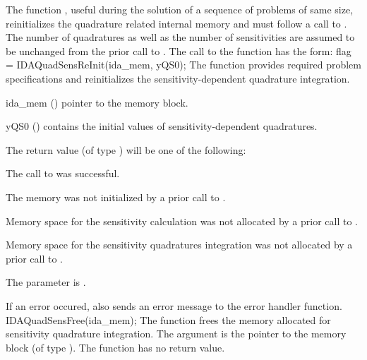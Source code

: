 The function , useful during the solution of a sequence 
of problems of same size, reinitializes the quadrature related internal memory 
and must follow a call to . The number  of 
quadratures as well as the number  of sensitivities are assumed to be 
unchanged from the prior call to .
The call to the  function has the form:
{
  flag = IDAQuadSensReInit(ida\_mem, yQS0);
}
{
  The function  provides required problem specifications 
  and reinitializes the sensitivity-dependent quadrature integration.
}
{
  \begin{args}
  \item[ida\_mem] ()
    pointer to the {\idas} memory block.
  \item[yQS0] ()
    contains the initial values of sensitivity-dependent quadratures.
  \end{args}
}
{
  The return value  (of type ) will be one of the following:
  \begin{args}
  \item[\Id{IDA\_SUCCESS}]
    The call to  was successful.
  \item[\Id{IDA\_MEM\_NULL}] 
    The {\idas} memory was not initialized by a prior call to .
  \item[\Id{IDA\_NO\_SENS}] 
    Memory space for the sensitivity calculation was not allocated by a prior
    call to .
  \item[\Id{IDA\_NO\_QUADSENS}] 
    Memory space for the sensitivity quadratures integration was not allocated by a prior
    call to .
  \item[\Id{IDA\_ILL\_INPUT}] 
    The parameter  is .
  \end{args}
}
{
  If an error occured,  also sends an error message to the
  error handler function.
}
{
  IDAQuadSensFree(ida\_mem);
}
{
  The function  frees the memory allocated for sensitivity 
  quadrature integration.
}
{
  The argument is the pointer to the {\idas} memory block (of type ).
}
{
  The function  has no return value.
}
{}


